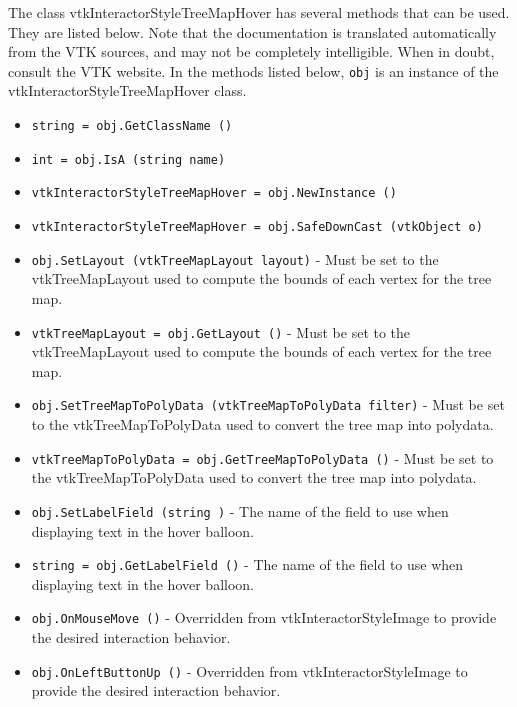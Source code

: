 The class vtkInteractorStyleTreeMapHover has several methods that can be used.
  They are listed below.
Note that the documentation is translated automatically from the VTK sources,
and may not be completely intelligible.  When in doubt, consult the VTK website.
In the methods listed below, \verb|obj| is an instance of the vtkInteractorStyleTreeMapHover class.
\begin{itemize}
\item  \verb|string = obj.GetClassName ()|

\item  \verb|int = obj.IsA (string name)|

\item  \verb|vtkInteractorStyleTreeMapHover = obj.NewInstance ()|

\item  \verb|vtkInteractorStyleTreeMapHover = obj.SafeDownCast (vtkObject o)|

\item  \verb|obj.SetLayout (vtkTreeMapLayout layout)| -  Must be set to the vtkTreeMapLayout used to compute the bounds of each vertex
 for the tree map.

\item  \verb|vtkTreeMapLayout = obj.GetLayout ()| -  Must be set to the vtkTreeMapLayout used to compute the bounds of each vertex
 for the tree map.

\item  \verb|obj.SetTreeMapToPolyData (vtkTreeMapToPolyData filter)| -  Must be set to the vtkTreeMapToPolyData used to convert the tree map
 into polydata.

\item  \verb|vtkTreeMapToPolyData = obj.GetTreeMapToPolyData ()| -  Must be set to the vtkTreeMapToPolyData used to convert the tree map
 into polydata.

\item  \verb|obj.SetLabelField (string )| -  The name of the field to use when displaying text in the hover balloon.

\item  \verb|string = obj.GetLabelField ()| -  The name of the field to use when displaying text in the hover balloon.

\item  \verb|obj.OnMouseMove ()| -  Overridden from vtkInteractorStyleImage to provide the desired
 interaction behavior.

\item  \verb|obj.OnLeftButtonUp ()| -  Overridden from vtkInteractorStyleImage to provide the desired
 interaction behavior.


\end{itemize}
